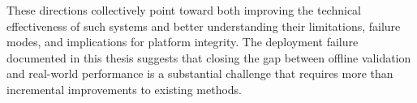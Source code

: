 These directions collectively point toward both improving the technical effectiveness of such systems and better understanding their limitations, failure modes, and implications for platform integrity. The deployment failure documented in this thesis suggests that closing the gap between offline validation and real-world performance is a substantial challenge that requires more than incremental improvements to existing methods.